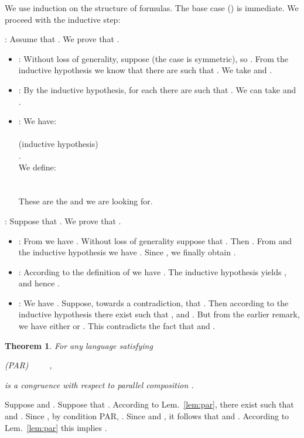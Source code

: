 \documentclass{eptcs}
\newtheorem{theo}{Theorem}
\newenvironment{theorem}{\begin{theo} \rm }{\end{theo}}
\newenvironment{proof}{\begin{trivlist} \item[\hspace{\labelsep}\bf Proof:]}{\hfill  \end{trivlist}}
\begin{document}
\begin{proof} 
 We use induction on the structure of formulas. The base case () is immediate. We proceed with the inductive step:
 
: Assume that . We prove that .

\begin{itemize}
\item : Without loss of generality, suppose  (the case  is symmetric), so . From the inductive hypothesis we know that there are  such that . We take  and .

\item : By the inductive hypothesis, for each  there are  such that . We can take  and .

\item : We have:\\
  \\
 (inductive hypothesis)\\
.\\
We define:\\
\\
\\
These are the  and  we are looking for.
\end{itemize}

: Suppose that . We prove that .
\begin{itemize}

\item : From  we have 
. Without loss of generality suppose that . Then . From  and the inductive hypothesis we have . Since , we finally obtain .

\item : According to the definition of  we have . The inductive hypothesis yields , and hence .

\item :  We have . Suppose, towards a contradiction, that . Then according to the inductive hypothesis there exist  such that ,  and . But from the earlier remark, we have either  or . This contradicts the fact that  and .

\end{itemize}
\end{proof}

\begin{theorem} For any language  satisfying 
\begin{center}
(PAR)~~~~~,
\end{center}
  is a congruence with respect to parallel composition .
\end{theorem}
\begin{proof}
Suppose  and . Suppose that . According to Lem.~\ref{lem:par}, there exist  such that  and . Since , by condition PAR, . Since  and , it follows that  and . According to Lem.~\ref{lem:par} this implies .

\end{proof}
\end{document}

